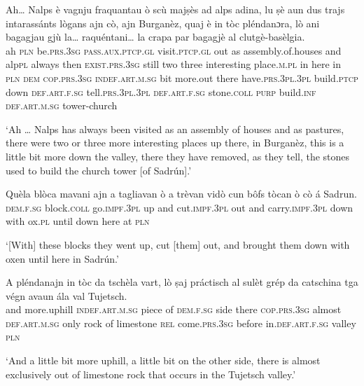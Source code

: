 \begin{linenumbers}
\gll Ah… Nalps è vagnju fraquantau ò scù majṣès ad alps adina, lu ṣè aun dus trajs intarassánts lògans ajn cò, ajn Burganèz, quaj è in tòc pléndanɔra, lò ani bagagjau gjù la… raquéntani… la crapa par bagagjè al clutgè-basèlgia.   \\
ah  \textsc{pln}  be.\textsc{prs.3sg} \textsc{pass.aux.ptcp.gl} visit.\textsc{ptcp.gl} out as assembly.of.houses and alp\textsc{pl} always then \textsc{exist.prs.3sg} still two three interesting place.\textsc{m.pl}  in here in \textsc{pln} \textsc{dem} \textsc{cop.prs.3sg} \textsc{indef.art.m.sg} bit more.out there have.\textsc{prs.3pl.3pl} build.\textsc{ptcp} down \textsc{def.art.f.sg} tell.\textsc{prs.3pl.3pl} \textsc{def.art.f.sg} stone.\textsc{coll} \textsc{purp} build.\textsc{inf}  \textsc{def.art.m.sg} tower-church  \\
\end{linenumbers}
\medskip
\glt `Ah … Nalps has always been visited as an assembly of houses and as pastures, there were two or three more interesting places up there, in Burganèz, this is a little bit more down the valley, there they have removed, as they tell, the stones used to build the church tower [of Sadrún].'
\medskip

\begin{linenumbers}
\gll   Quèla blòca mavani ajn a tagliavan ò a trèvan vidò cun bôfs tòcan ò cò á Sadrun. \\
 \textsc{dem.f.sg} block.\textsc{coll}  go.\textsc{impf.3pl} up and cut.\textsc{impf.3pl} out and carry.\textsc{impf.3pl} down  with ox.\textsc{pl} until down here at \textsc{pln}  \\
\end{linenumbers}
\medskip
\glt `[With] these blocks they went up, cut [them] out, and brought them down with oxen until here in Sadrún.'
\medskip

\begin{linenumbers}
\gll   A pléndanajn in tòc da tschèla vart, lò ṣaj práctisch al sulèt grép da catschina tga végn avaun ála val Tujetsch. \\
and more.uphill  \textsc{indef.art.m.sg} piece of  \textsc{dem.f.sg} side there \textsc{cop.prs.3sg} almost \textsc{def.art.m.sg} only rock of limestone \textsc{rel} come.\textsc{prs.3sg} before in.\textsc{def.art.f.sg} valley \textsc{pln}   \\
\end{linenumbers}
\medskip
\glt `And a little bit more uphill, a little bit on the other side, there is almost exclusively out of limestone rock that occurs in the Tujetsch valley.'
\medskip

